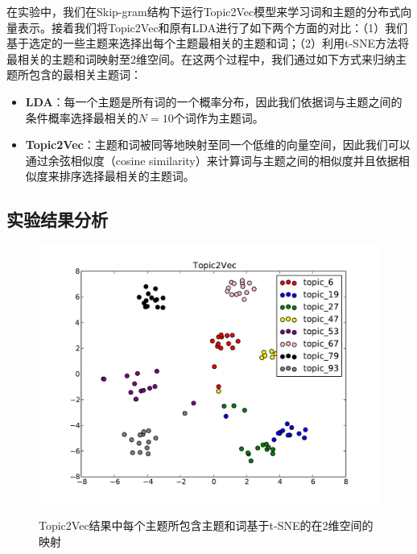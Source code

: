 \documentclass[master]{njuthesis}
\begin{document}
在实验中，我们在Skip-gram结构下运行Topic2Vec模型来学习词和主题的分布式向量表示。接着我们将Topic2Vec和原有LDA进行了如下两个方面的对比：（1）我们基于选定的一些主题来选择出每个主题最相关的主题和词；（2）利用t-SNE\cite{van2008visualizing}方法将最相关的主题和词映射至2维空间。在这两个过程中，我们通过如下方式来归纳主题所包含的最相关主题词：

	\begin{itemize}
	\item \textbf{LDA}：每一个主题是所有词的一个概率分布，因此我们依据词与主题之间的条件概率选择最相关的$N=10$个词作为主题词。
	\item \textbf{Topic2Vec}：主题和词被同等地映射至同一个低维的向量空间，因此我们可以通过余弦相似度（cosine similarity）来计算词与主题之间的相似度并且依据相似度来排序选择最相关的主题词。
	\end{itemize}

\subsection{实验结果分析}

\begin{figure}[t]
  \centering
  \includegraphics[width= 1.0\textwidth]{figures//tw_tsne_chap3.pdf}\\
  \caption{Topic2Vec结果中每个主题所包含主题和词基于t-SNE的在2维空间的映射}\label{fig:tw_tsne_chap3}
\end{figure}
\end{document}
